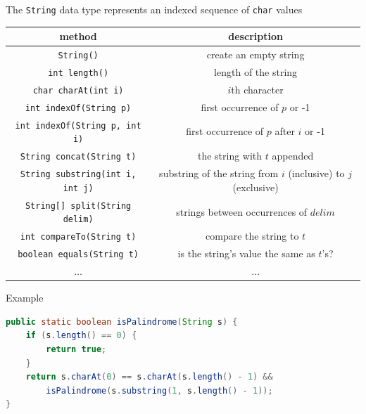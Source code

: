 \documentclass[8pt,a4paper,compress]{beamer}
\begin{document}
\begin{frame}[fragile]
\pause
The \lstinline{String} data type represents an indexed sequence of \lstinline{char} values

\begin{center}
\begin{tabular}{cc}
method & description \\ \hline
\lstinline$String()$ & create an empty string \\
\lstinline$int length()$ & length of the string \\
\lstinline$char charAt(int i)$ & $i$th character \\
\lstinline$int indexOf(String p)$ & first occurrence of $p$ or -1 \\ \lstinline$int indexOf(String p, int i)$ & first occurrence of $p$ after $i$ or -1 \\
\lstinline$String concat(String t)$ & the string with $t$ appended \\
\lstinline$String substring(int i, int j)$ & substring of the string from $i$ (inclusive) to $j$ (exclusive) \\
\lstinline$String[] split(String delim)$ & strings between occurrences of $delim$ \\
\lstinline$int compareTo(String t)$ & compare the string to $t$ \\
\lstinline$boolean equals(String t)$ & is the string's value the same as $t$'s? \\
$\dots$ & $\dots$
\end{tabular} 
\end{center}

\pause
\bigskip

Example
\begin{lstlisting}[language=Java]
public static boolean isPalindrome(String s) {
    if (s.length() == 0) {
        return true;
    } 
    return s.charAt(0) == s.charAt(s.length() - 1) && 
        isPalindrome(s.substring(1, s.length() - 1));
}
\end{lstlisting}
\end{frame}
\end{document}
